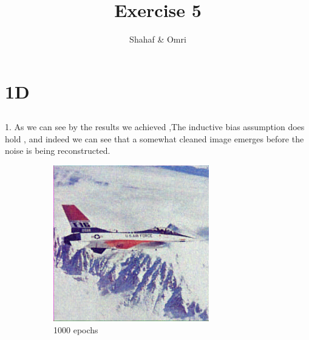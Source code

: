 \documentclass[12pt]{article}
\title{Exercise 5}
\author{Shahaf \& Omri}
\begin{document}
\maketitle

\section{1D}
\subsection{}
1. As we can see by the results we achieved ,The inductive bias assumption does hold , and indeed we can see that a somewhat cleaned image emerges before the noise is being reconstructed.

\begin{figure}[h!]
  \centering
  \begin{subfigure}[b]{0.4\linewidth}
    \includegraphics[width=\linewidth]{result1d.png}
    \caption{1000 epochs}
  \end{subfigure}
  \begin{subfigure}[b]{0.4\linewidth}

\end{subfigure}
\end{figure}
\end{document}
